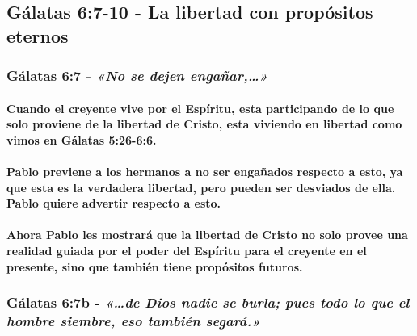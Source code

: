 \documentclass[11a pt,twoside]{article}
\newcommand{\scripture}[1]{%
  {\fontsize{12pt}{16pt}\selectfont\ScriptureFont\itshape #1}%
}
\let\oldsubsection\subsection
\renewcommand{\subsection}{\needspace{5\baselineskip}\oldsubsection}
\let\oldsubsubsection\subsubsection
\renewcommand{\subsubsection}{\needspace{4\baselineskip}\oldsubsubsection}
\let\oldparagraph\paragraph
\renewcommand{\paragraph}{\needspace{3\baselineskip}\oldparagraph}
\begin{document}
\subsection{Gálatas 6:7-10 - La libertad con propósitos
eternos}\label{guxe1latas-67-10---la-libertad-con-propuxf3sitos-eternos}

\subsubsection{\texorpdfstring{Gálatas 6:7 -
\scripture{«No se dejen engañar,…»}}{Gálatas 6:7 - }}\label{guxe1latas-67---no-se-dejen-engauxf1ar}

\paragraph{Cuando el creyente vive por el Espíritu, esta participando de
lo que solo proviene de la libertad de Cristo, esta viviendo en libertad
como vimos en Gálatas
5:26-6:6.}\label{cuando-el-creyente-vive-por-el-espuxedritu-esta-participando-de-lo-que-solo-proviene-de-la-libertad-de-cristo-esta-viviendo-en-libertad-como-vimos-en-guxe1latas-526-66.}

\paragraph{Pablo previene a los hermanos a no ser engañados respecto a
esto, ya que esta es la verdadera libertad, pero pueden ser desviados de
ella. Pablo quiere advertir respecto a
esto.}\label{pablo-previene-a-los-hermanos-a-no-ser-engauxf1ados-respecto-a-esto-ya-que-esta-es-la-verdadera-libertad-pero-pueden-ser-desviados-de-ella.-pablo-quiere-advertir-respecto-a-esto.}

\paragraph{Ahora Pablo les mostrará que la libertad de Cristo no solo
provee una realidad guiada por el poder del Espíritu para el creyente en
el presente, sino que también tiene propósitos
futuros.}\label{ahora-pablo-les-mostraruxe1-que-la-libertad-de-cristo-no-solo-provee-una-realidad-guiada-por-el-poder-del-espuxedritu-para-el-creyente-en-el-presente-sino-que-tambiuxe9n-tiene-propuxf3sitos-futuros.}

\subsubsection{\texorpdfstring{Gálatas 6:7b -
\scripture{«…de Dios nadie se burla; pues todo lo que el hombre siembre, eso también segará.»}}{Gálatas 6:7b - }}\label{guxe1latas-67b---de-dios-nadie-se-burla-pues-todo-lo-que-el-hombre-siembre-eso-tambiuxe9n-segaruxe1.}
\end{document}
